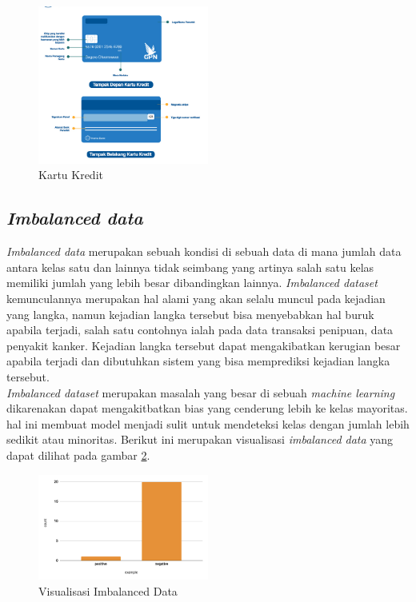 \begin{figure}[H] %
    \centering
    \includegraphics[width=0.5\textwidth]{figure/kartu.png}
    \caption{Kartu Kredit}
    \label{fig:2.kartukredit}
\end{figure}

\subsection{\textit{Imbalanced data}} \label{II.Imbalanced Data}
\textit{Imbalanced data} merupakan sebuah kondisi di sebuah data di mana jumlah data antara kelas satu dan lainnya tidak seimbang yang artinya salah satu kelas memiliki jumlah yang lebih besar dibandingkan lainnya\cite{haixiang2017learning}. \textit{Imbalanced dataset} kemunculannya merupakan hal alami yang akan selalu muncul pada kejadian yang langka, namun kejadian langka tersebut bisa menyebabkan hal buruk apabila terjadi, salah satu contohnya ialah  pada data transaksi penipuan, data penyakit kanker\cite{krawczyk2016learning}. Kejadian langka tersebut dapat mengakibatkan kerugian besar apabila terjadi dan dibutuhkan sistem yang bisa memprediksi kejadian langka tersebut\cite{krawczyk2016learning}.\\
\textit{Imbalanced dataset} merupakan masalah yang besar di sebuah\textit{ machine learning} dikarenakan dapat mengakitbatkan bias yang cenderung lebih ke kelas mayoritas. hal ini membuat model menjadi sulit untuk mendeteksi kelas dengan jumlah lebih sedikit atau minoritas\cite{haixiang2017learning}. Berikut ini merupakan visualisasi \textit{imbalanced data} yang dapat dilihat pada gambar \ref{fig:2.visualisasiimbalanced}.
\begin{figure}[H] %
    \centering
    \includegraphics[width=0.5\textwidth]{figure/gambar imbalance data.png}
    \caption{Visualisasi Imbalanced Data}
    \label{fig:2.visualisasiimbalanced}
\end{figure}

